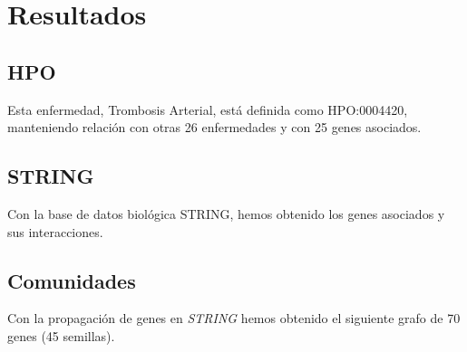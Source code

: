  \newpage
 \section{Resultados}
 
 \subsection{HPO}
 Esta enfermedad, Trombosis Arterial, está definida como HPO:0004420, manteniendo relación con otras 26 enfermedades y con 25 genes asociados.
 
 \subsection{STRING}
 Con la base de datos biológica STRING, hemos obtenido los genes asociados y sus interacciones.
 
 \begin{minipage}{\linewidth}
 	\label{fig: Figura 3}
 \end{minipage}



\subsection{Comunidades}
Con la propagación de genes en \textit{STRING} hemos obtenido el siguiente grafo de 70 genes (45 semillas).

